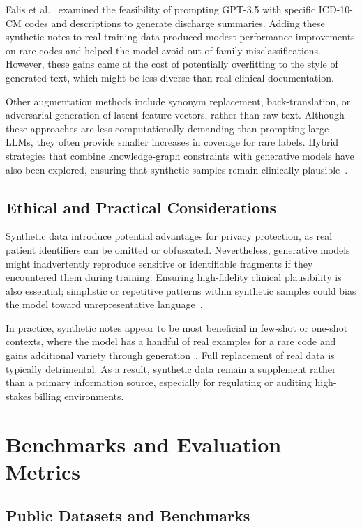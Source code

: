Falis et al.~\citep{falis2024gpt35} examined the feasibility of prompting GPT-3.5 with specific ICD-10-CM codes and descriptions to generate discharge summaries. Adding these synthetic notes to real training data produced modest performance improvements on rare codes and helped the model avoid out-of-family misclassifications. However, these gains came at the cost of potentially overfitting to the style of generated text, which might be less diverse than real clinical documentation.

Other augmentation methods include synonym replacement, back-translation, or adversarial generation of latent feature vectors, rather than raw text. Although these approaches are less computationally demanding than prompting large LLMs, they often provide smaller increases in coverage for rare labels. Hybrid strategies that combine knowledge-graph constraints with generative models have also been explored, ensuring that synthetic samples remain clinically plausible~\citep{falis2022horsestozebras}.

\subsection{ Ethical and Practical Considerations}

Synthetic data introduce potential advantages for privacy protection, as real patient identifiers can be omitted or obfuscated. Nevertheless, generative models might inadvertently reproduce sensitive or identifiable fragments if they encountered them during training. Ensuring high-fidelity clinical plausibility is also essential; simplistic or repetitive patterns within synthetic samples could bias the model toward unrepresentative language~\citep{pollard2018eicu}.

In practice, synthetic notes appear to be most beneficial in few-shot or one-shot contexts, where the model has a handful of real examples for a rare code and gains additional variety through generation~\citep{rios2018few}. Full replacement of real data is typically detrimental. As a result, synthetic data remain a supplement rather than a primary information source, especially for regulating or auditing high-stakes billing environments.

\section{Benchmarks and Evaluation Metrics}

\subsection{Public Datasets and Benchmarks}

